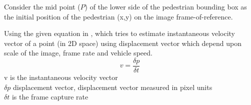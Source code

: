 





Consider the mid point ($P$) of the lower side of the pedestrian bounding box as the initial position of the pedestrian (x,y) on the image frame-of-reference.




Using the given equation in \cite{dougan2010real}, which tries to estimate instantaneous velocity vector of a point (in 2D space) using displacement vector which depend upon scale of the image, frame rate and vehicle speed.
\begin{equation} \label{conversion}
{v}= \frac{\delta p}{\delta t}
\end{equation} 
v is the instantaneous velocity vector \\
${\delta p}$ displacement vector, displacement vector measured in pixel units \\
${\delta t}$ is the frame capture rate

